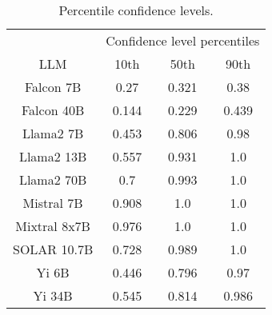\begin{table*}
\centering
\begin{tabular}{c|c|c|c}
& \multicolumn{3}{c}{Confidence level percentiles} \\ 
LLM & 10th & 50th & 90th\\ \hline
Falcon 7B & 0.27 & 0.321 & 0.38\\
Falcon 40B & 0.144 & 0.229 & 0.439\\
Llama2 7B & 0.453 & 0.806 & 0.98\\
Llama2 13B & 0.557 & 0.931 & 1.0\\
Llama2 70B & 0.7 & 0.993 & 1.0\\
Mistral 7B & 0.908 & 1.0 & 1.0\\
Mixtral 8x7B & 0.976 & 1.0 & 1.0\\
SOLAR 10.7B & 0.728 & 0.989 & 1.0\\
Yi 6B & 0.446 & 0.796 & 0.97\\
Yi 34B & 0.545 & 0.814 & 0.986\\
\hline
\end{tabular}
\caption{Percentile confidence levels.}
\label{tab:percentile_conf}
\end{table*}
